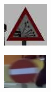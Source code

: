 \begin{figure}[h]
\begin{subfigure}[b]{0.15\linewidth}
    \caption{}
  \end{subfigure}
  \begin{subfigure}[b]{0.15\linewidth}
    \includegraphics[width=\linewidth]{figures/signs/LooseGravel.jpg}
    \caption{}
  \end{subfigure}
  \begin{subfigure}[b]{0.15\linewidth}
    \includegraphics[width=\linewidth]{figures/signs/NoEntry.jpg}
    \caption{}
  \end{subfigure}

\end{figure}
